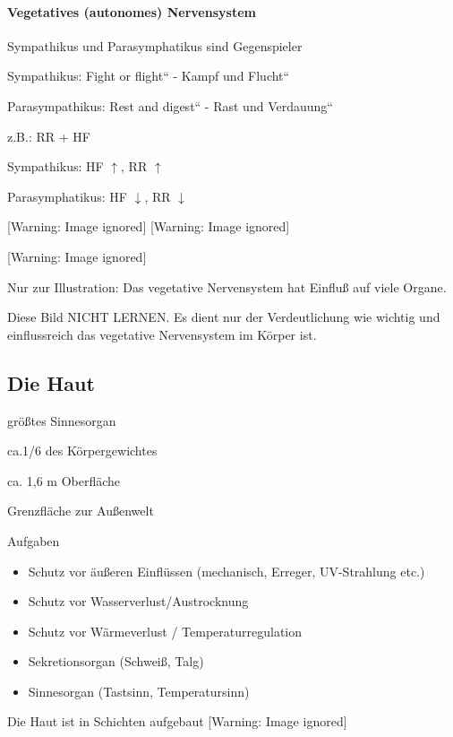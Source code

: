 \documentclass{article}
\begin{document}
\paragraph[Vegetatives (autonomes) \ Nervensystem]{Vegetatives
(autonomes)  Nervensystem}
Sympathikus  und Parasymphatikus  sind  Gegenspieler

Sympathikus: {\quotedblbase}Fight or flight{\textquotedblleft} -
{\quotedblbase}Kampf und Flucht{\textquotedblleft}

Parasympathikus: {\quotedblbase}Rest and digest{\textquotedblleft} -
{\quotedblbase}Rast und Verdauung{\textquotedblleft}

z.B.: RR + HF

Sympathikus:  HF ${\uparrow}$, RR ${\uparrow}$

Parasymphatikus: HF ${\downarrow}$, RR ${\downarrow}$

  [Warning: Image ignored] %
   [Warning: Image ignored] %
 

  [Warning: Image ignored] %
 

Nur zur Illustration: Das vegetative Nervensystem hat Einflu{\ss} auf
viele Organe.

Diese Bild NICHT LERNEN. Es dient nur der Verdeutlichung wie wichtig und
einflussreich das vegetative Nervensystem im K\"orper ist. 

\subsection{Die Haut}
gr\"o{\ss}tes Sinnesorgan

ca.1/6 des K\"orpergewichtes

ca. 1,6 m{\texttwosuperior} Oberfl\"ache

Grenzfl\"ache zur Au{\ss}enwelt

Aufgaben

\begin{itemize}
\item Schutz vor \"au{\ss}eren Einfl\"ussen (mechanisch, Erreger,
UV-Strahlung etc.)

\item Schutz vor Wasserverlust/Austrocknung

\item Schutz vor W\"armeverlust /  Temperaturregulation

\item Sekretionsorgan (Schwei{\ss}, Talg)

\item Sinnesorgan (Tastsinn, Temperatursinn)

\end{itemize}
Die Haut ist in Schichten aufgebaut%
%
  [Warning: Image ignored] %
 
\end{document}

